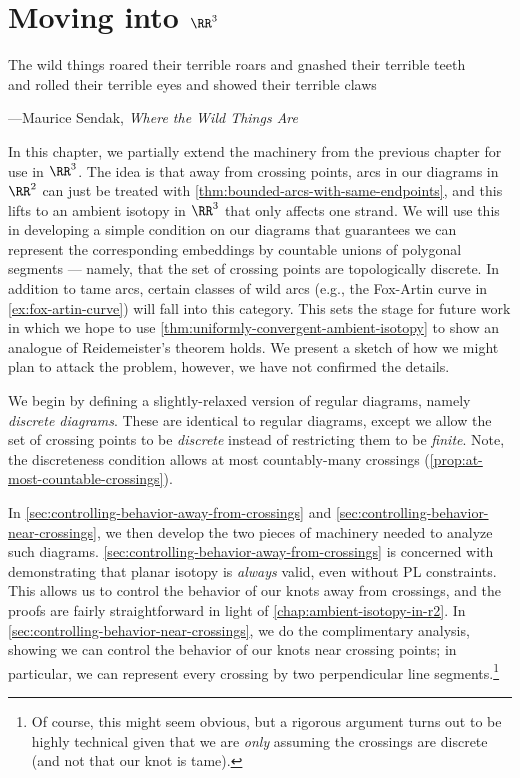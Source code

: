 \chapter{Moving into $\RR^3$}\label{chap:moving-into-r3}
\setlength{}
\epigraph{The wild things roared their terrible roars and gnashed their terrible teeth\\
  and rolled their terrible eyes and showed their terrible
  claws}{---Maurice Sendak, \emph{Where the Wild Things Are}}


In this chapter, we partially extend the machinery from the previous
chapter for use in $\RR^3$. The idea is that away from crossing
points, arcs in our diagrams in $\RR^2$ can just be treated with
\cref{thm:bounded-arcs-with-same-endpoints}, and this lifts to an
ambient isotopy in $\RR^3$ that only affects one strand. We will use
this in developing a simple condition on our diagrams that guarantees
we can represent the corresponding embeddings by countable unions of
polygonal segments --- namely, that the set of crossing points are
topologically discrete. In addition to tame arcs, certain classes of
wild arcs (e.g., the Fox-Artin curve in \cref{ex:fox-artin-curve})
will fall into this category. This sets the stage for future work in
which we hope to use \cref{thm:uniformly-convergent-ambient-isotopy}
to show an analogue of Reidemeister's theorem holds. We present a
sketch of how we might plan to attack the problem, however, we have
not confirmed the details. %

We begin by defining a slightly-relaxed version of regular diagrams,
namely \emph{discrete diagrams}. These are identical to regular
diagrams, except we allow the set of crossing points to be
\emph{discrete} instead of restricting them to be \emph{finite}. Note,
the discreteness condition allows at most countably-many crossings
(\cref{prop:at-most-countable-crossings}).

In \cref{sec:controlling-behavior-away-from-crossings} and
\cref{sec:controlling-behavior-near-crossings}, we then develop the
two pieces of machinery needed to analyze such diagrams.
\cref{sec:controlling-behavior-away-from-crossings} is concerned with
demonstrating that planar isotopy is \emph{always} valid, even without
PL constraints. This allows us to control the behavior of our knots
away from crossings, and the proofs are fairly straightforward in
light of \cref{chap:ambient-isotopy-in-r2}. In
\cref{sec:controlling-behavior-near-crossings}, we do the
complimentary analysis, showing we can control the behavior of our
knots near crossing points; in particular, we can represent every
crossing by two perpendicular line segments.\footnote{Of course, this
  might seem obvious, but a rigorous argument turns out to be highly
  technical given that we are \emph{only} assuming the crossings are
  discrete (and not that our knot is tame).}

